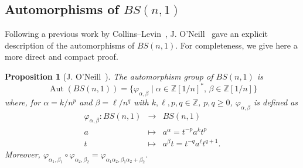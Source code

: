 \documentclass[english]{amsart}
\newtheorem{prop}[thm]{Proposition}
\theoremstyle{definition}
\newcommand\ZZ{\mathbb{Z}}
\newcommand{\Aut}{\operatorname{Aut}}
\begin{document}
\subsection{Automorphisms of $BS(n,1)$}\label{sec: autos}

Following a previous work by Collins--Levin~\cite{CoLe}, J. O'Neill~\cite{N} gave an explicit description of the automorphisms of $BS(n,1)$. For completeness, we give here a more direct and compact proof. 

\begin{prop}[J. O'Neill~\cite{N}]\label{prop: O'Neil}
The automorphism group of $BS(n,1)$ is 
 $$
\Aut(BS(n,1))=\{\varphi_{\alpha, \beta} \mid \alpha\in \ZZ[1/n]^*,\, \beta \in \ZZ[1/n]\}
 $$
where, for $\alpha=k/n^p$ and $\beta=\ell/n^q$ with $k,\ell, p,q\in \ZZ$, $p,q\geq 0$, $\varphi_{\alpha, \beta}$ is defined as
 $$
\begin{array}{rcl} \varphi_{\alpha, \beta}\colon BS(n,1) & \to & BS(n,1) \\ a & \mapsto & a^{\alpha}=t^{-p} a^k t^p \\ t & \mapsto & a^{\beta}t=t^{-q}a^{\ell} t^{q+1}. 
 \end{array}
 $$
Moreover, $\varphi_{\alpha_1, \beta_1} \circ \varphi_{\alpha_2, \beta_2} =\varphi_{\alpha_1\alpha_2, \beta_1\alpha_2+\beta_2}$.
\end{prop}
\end{document}
